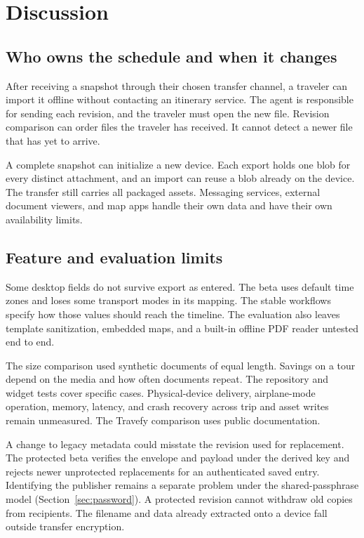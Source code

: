 \section{Discussion}
\subsection{Who owns the schedule and when it changes}
After receiving a snapshot through their chosen transfer channel, a traveler can import it offline without contacting an itinerary service. The agent is responsible for sending each revision, and the traveler must open the new file. Revision comparison can order files the traveler has received. It cannot detect a newer file that has yet to arrive.

A complete snapshot can initialize a new device. Each export holds one blob for every distinct attachment, and an import can reuse a blob already on the device. The transfer still carries all packaged assets. Messaging services, external document viewers, and map apps handle their own data and have their own availability limits.

\subsection{Feature and evaluation limits}
Some desktop fields do not survive export as entered. The beta uses default time zones and loses some transport modes in its mapping. The stable workflows specify how those values should reach the timeline. The evaluation also leaves template sanitization, embedded maps, and a built-in offline PDF reader untested end to end.

The size comparison used synthetic documents of equal length. Savings on a tour depend on the media and how often documents repeat. The repository and widget tests cover specific cases. Physical-device delivery, airplane-mode operation, memory, latency, and crash recovery across trip and asset writes remain unmeasured. The Travefy comparison uses public documentation.

A change to legacy metadata could misstate the revision used for replacement. The protected beta verifies the envelope and payload under the derived key and rejects newer unprotected replacements for an authenticated saved entry. Identifying the publisher remains a separate problem under the shared-passphrase model (Section~\ref{sec:password}). A protected revision cannot withdraw old copies from recipients. The filename and data already extracted onto a device fall outside transfer encryption.

